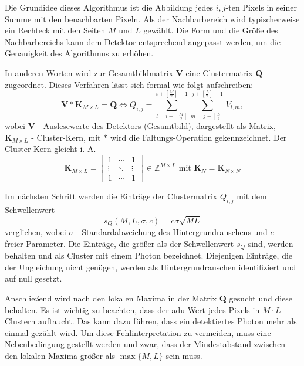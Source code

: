 \noindent
Die Grundidee dieses Algorithmus ist die Abbildung jedes $i,j$-ten Pixels in seiner Summe mit den benachbarten Pixeln. Als der Nachbarbereich wird typischerweise ein Rechteck mit den Seiten $M$ und $L$ gewählt. Die Form und die Größe des Nachbarbereichs kann dem Detektor entsprechend angepasst werden, um die Genauigkeit des Algorithmus zu erhöhen.

\noindent
In anderen Worten wird zur Gesamtbildmatrix $\mathbf{V}$ eine Clustermatrix $\mathbf{Q}$ zugeordnet. Dieses Verfahren lässt sich formal wie folgt aufschreiben:
\begin{equation}
     \mathbf{V} * \mathbf{K}_{M\times L} =  \mathbf{Q} \Leftrightarrow Q_{i, j} = \sum_{l=i-\left[\frac{M}{2}\right]}^{i+\left[\frac{M}{2}\right]-1} \sum_{m=j-\left[\frac{L}{2}\right]}^{j+\left[\frac{L}{2}\right]-1} V_{l,m},
\end{equation}
wobei $\mathbf{V}$ - Auslesewerte des Detektors (Gesamtbild), dargestellt als Matrix, $\mathbf{K}_{M \times L}$ - Cluster-Kern, mit $*$ wird die Faltungs-Operation gekennzeichnet. Der Cluster-Kern gleicht i. A.
\begin{equation}
    \mathbf{K}_{M \times L}  = \begin{bmatrix}
1 & \cdots & 1\\
\vdots & \ddots & \vdots\\
1 & \cdots & 1
\end{bmatrix}
\in \mathbb{Z}^{M \times L} \text{ mit } \mathbf{K}_N = \mathbf{K}_{N \times N}
\label{eq:cluster-kern}
\end{equation}

\noindent
Im nächsten Schritt werden die Einträge der Clustermatrix $Q_{i,j}$ mit dem Schwellenwert 
\begin{equation}
    s_Q(M, L, \sigma, c) = c\sigma\sqrt{ML}
\end{equation}
verglichen, wobei $\sigma$ - Standardabweichung des Hintergrundrauschens und $c$ - freier Parameter. Die Einträge, die größer als der Schwellenwert $s_Q$ sind, werden behalten und als Cluster mit einem Photon bezeichnet. Diejenigen Einträge, die der Ungleichung nicht genügen, werden als Hintergrundrauschen identifiziert und auf null gesetzt.

\noindent
Anschließend wird nach den lokalen Maxima in der Matrix $\mathbf{Q}$ gesucht und diese behalten. Es ist wichtig zu beachten, dass der \gls{adu}-Wert jedes Pixels in $M\cdot L$ Clustern auftaucht. Das kann dazu führen, dass ein detektiertes Photon mehr als einmal gezählt wird. Um diese Fehlinterpretation zu vermeiden, muss eine Nebenbedingung gestellt werden und zwar, dass der Mindestabstand zwischen den lokalen Maxima größer als $\max\{M,L\}$ sein muss.

